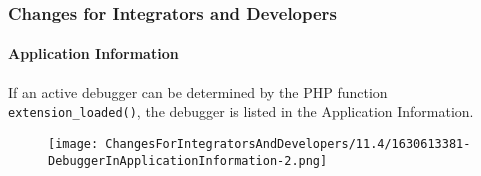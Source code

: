 %

\begin{frame}[fragile]
	\frametitle{Changes for Integrators and Developers}
	\framesubtitle{Application Information}

	If an active debugger can be determined by the PHP function
	\texttt{extension\_loaded()}, the debugger is listed in the Application
	Information.

	\begin{figure}
		\texttt{[image: ChangesForIntegratorsAndDevelopers/11.4/1630613381-DebuggerInApplicationInformation-2.png]}
	\end{figure}

\end{frame}

